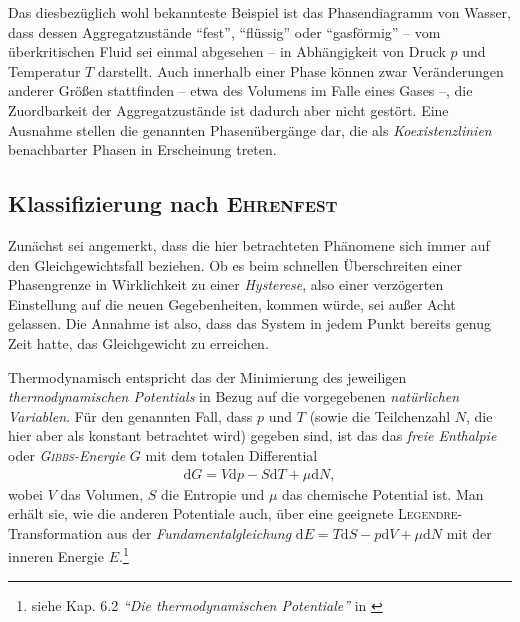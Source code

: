 \documentclass[a4paper, 10pt, twoside, openany]{book} %
\def \D {\mathrm d}
\begin{document}
	Das diesbezüglich wohl bekannteste Beispiel ist das Phasendiagramm von Wasser, dass dessen Aggregatzustände "`fest"', "`flüssig"' oder "`gasförmig"' -- vom überkritischen Fluid sei einmal abgesehen -- in Abhängigkeit von Druck $p$ und Temperatur $T$ darstellt. Auch innerhalb einer Phase können zwar Veränderungen anderer Größen stattfinden -- etwa des Volumens im Falle eines Gases --, die Zuordbarkeit der Aggregatzustände ist dadurch aber nicht gestört. Eine Ausnahme stellen die genannten Phasenübergänge dar, die als \emph{Koexistenzlinien} benachbarter Phasen in Erscheinung treten.
	
	\subsection{Klassifizierung nach \textsc{Ehrenfest}}
	
	Zunächst sei angemerkt, dass die hier betrachteten Phänomene sich immer auf den Gleichgewichtsfall beziehen. Ob es beim schnellen Überschreiten einer Phasengrenze in Wirklichkeit zu einer \emph{Hysterese}, also einer verzögerten Einstellung auf die neuen Gegebenheiten, kommen würde, sei außer Acht gelassen. Die Annahme ist also, dass das System in jedem Punkt bereits genug Zeit hatte, das Gleichgewicht zu erreichen.
	
	Thermodynamisch entspricht das der Minimierung des jeweiligen \emph{thermodynamischen Potentials} in Bezug auf die vorgegebenen \emph{natürlichen Variablen}. Für den genannten Fall, dass $p$ und $T$ (sowie die Teilchenzahl $N$, die hier aber als konstant betrachtet wird) gegeben sind, ist das das \emph{freie Enthalpie} oder \emph{\textsc{Gibbs}-Energie} $G$ mit dem totalen Differential
	\begin{align*}
		\D G = V \D p - S \D T + \mu \D N,
	\end{align*}
	wobei $V$ das Volumen, $S$ die Entropie und $\mu$ das chemische Potential ist. Man erhält sie, wie die anderen Potentiale auch, über eine geeignete \textsc{Legendre}-Transformation aus der \emph{Fundamentalgleichung} $\D E = T \D S - p \D V + \mu \D N$ mit der inneren Energie $E$.\footnote{siehe Kap. 6.2 \emph{"`Die thermodynamischen Potentiale"'} in \cite{Jelitto}}
	
\end{document}
